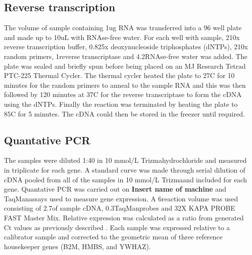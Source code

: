 \subsection{Reverse transcription}

The volume of sample containing 1ug RNA was transferred into a 96 well plate and made up to 10uL with RNAse-free water. For each well with sample, 2\uL 10x reverse transcription buffer, 0.8\uL 25x deoxynucleoside triphosphates (dNTPs), 2\uL 10x random primers, 1\uL reverse transcriptase and 4.2\uL RNAse-free water was added. The plate was sealed and briefly spun before being placed on an MJ Research Tetrad PTC-225 Thermal Cycler. The thermal cycler heated the plate to 27\textdegree C for 10 minutes for the random primers to anneal to the sample RNA and this was then followed by 120 minutes at 37\textdegree C for the reverse transcriptase to form the cDNA using the dNTPs. Finally the reaction was terminated by heating the plate to 85\textdegree C for 5 minutes. The cDNA could then be stored in the freezer until required. 

\subsection{Quantative PCR}

The samples were diluted 1:40 in 10 mmol/L Trizma\R hydrochloride and measured in triplicate for each gene. A standard curve was made through serial dilution of cDNA pooled from all of the samples in 10 mmol/L Trizma\R and included for each gene. Quantative PCR was carried out on \textbf{Insert name of machine} and TaqMan\R assays used to measure gene expression. A 6\uL reaction volume was used consisting of 2.7\uL of sample cDNA, 0.3\uL TaqMan\R probes and 3\uL 2X KAPA PROBE FAST Master Mix. Relative expression was calculated as a ratio from generated Ct values as previously described \cite{Pfaffl2001ARTPCR}. Each sample was expressed relative to a calibrator sample and corrected to the geometric mean of three reference housekeeper genes (B2M, HMBS, and YWHAZ).